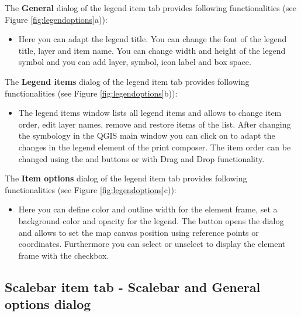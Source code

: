 
The \textbf{General} dialog of the legend item tab provides following
functionalities (see Figure \ref{fig:legendoptions}a)):

\begin{itemize}[label=--]
\item Here you can adapt the legend title. You can change the font of the
legend title, layer and item name. You can change width and height of the
legend symbol and you can add layer, symbol, icon label and box space.
\end{itemize}


The \textbf{Legend items} dialog of the legend item tab provides following
functionalities (see Figure \ref{fig:legendoptions}b)):

\begin{itemize}[label=--]
\item The legend items window lists all legend items and allows to change
item order, edit layer names, remove and restore items of the list. After
changing the symbology in the QGIS main window you can click on  to
adapt the changes in the legend element of the print composer. The item order
can be changed using the  and  buttons or with Drag and Drop
functionality.
\end{itemize}


The \textbf{Item options} dialog of the legend item tab provides following
functionalities (see Figure \ref{fig:legendoptions}c)):

\begin{itemize}[label=--]
\item Here you can define color and outline width for the element frame, set
a background color and opacity for the legend. The 
button opens the  dialog and allows to set the map
canvas position using reference points or coordinates. Furthermore you can
select or unselect to display the element frame with the  checkbox.
\end{itemize}

\subsection{Scalebar item tab - Scalebar and General options dialog}

